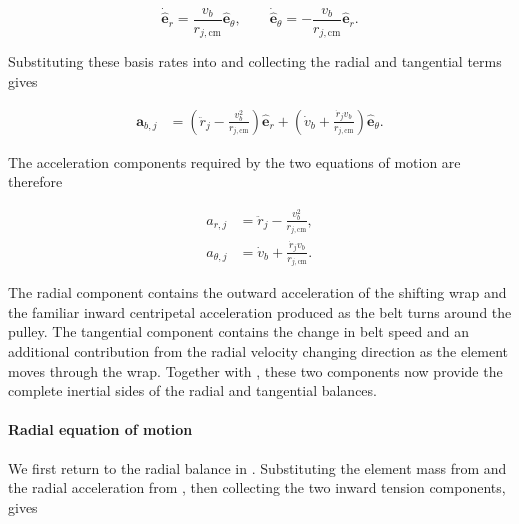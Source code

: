 \documentclass[11pt]{report}
\numberwithin{equation}{section}
\begin{document}
\begin{equation}
    \dot{\hat{\mathbf e}}_r
    =
    \frac{v_b}{r_{j,\mathrm{cm}}}\hat{\mathbf e}_\theta,
    \qquad
    \dot{\hat{\mathbf e}}_\theta
    =
    -\frac{v_b}{r_{j,\mathrm{cm}}}\hat{\mathbf e}_r.
    \label{eq:wrap_element_basis_rates}
\end{equation}

Substituting these basis rates into
 and collecting the radial and
tangential terms gives

\begin{align}
    \mathbf a_{b,j}
    &=
    \left(
        \ddot r_j
        -
        \frac{v_b^2}{r_{j,\mathrm{cm}}}
    \right)
    \hat{\mathbf e}_r
    +
    \left(
        \dot v_b
        +
        \frac{\dot r_jv_b}{r_{j,\mathrm{cm}}}
    \right)
    \hat{\mathbf e}_\theta.
    \label{eq:wrap_element_acceleration_expansion}
\end{align}

The acceleration components required by the two equations of motion are
therefore

\begin{align}
    a_{r,j}
    &=
    \ddot r_j
    -
    \frac{v_b^2}{r_{j,\mathrm{cm}}},
    \label{eq:wrap_radial_acceleration}
    \\
    a_{\theta,j}
    &=
    \dot v_b
    +
    \frac{\dot r_jv_b}{r_{j,\mathrm{cm}}}.
    \label{eq:wrap_tangential_acceleration}
\end{align}

The radial component contains the outward acceleration of the shifting wrap
and the familiar inward centripetal acceleration produced as the belt turns
around the pulley. The tangential component contains the change in belt speed
and an additional contribution from the radial velocity changing direction as
the element moves through the wrap. Together with
, these two components now provide the complete
inertial sides of the radial and tangential balances.

\paragraph{Radial equation of motion}

We first return to the radial balance in
. Substituting the element mass from
 and the radial acceleration from
, then collecting the two inward tension
components, gives
\end{document}
